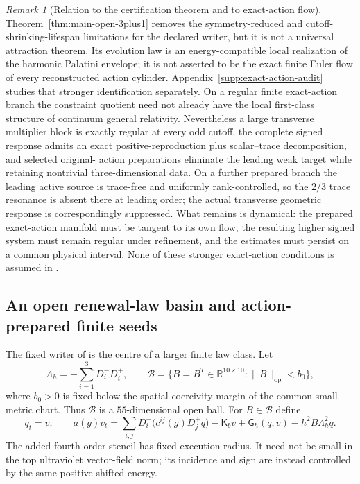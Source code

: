 \documentclass[11pt]{article}
\theoremstyle{definition}
\theoremstyle{remark}
\newtheorem{remark}[remark]{Remark}
\newcommand{\op}{\mathrm{op}}
\begin{document}
\begin{remark}[Relation to the certification theorem and to exact-action flow]
\label{rem:main-open-3plus1-scope}
Theorem~\ref{thm:main-open-3plus1} removes the symmetry-reduced and
cutoff-shrinking-lifespan limitations for the declared writer, but it is not a
universal attraction theorem.  Its evolution law is an energy-compatible
local realization of the harmonic Palatini envelope; it is not asserted to
be the exact finite Euler flow of every reconstructed action cylinder.
Appendix~\ref{supp:exact-action-audit} studies that stronger identification
separately.  On a regular finite exact-action branch the constraint quotient
need not already have the local first-class structure of continuum general
relativity.  Nevertheless a large transverse multiplier block is exactly
regular at every odd cutoff, the complete signed response admits an exact
positive-reproduction plus scalar--trace decomposition, and selected original-
action preparations eliminate the leading weak target while retaining
nontrivial three-dimensional data.  On a further prepared branch the leading
active source is trace-free and uniformly rank-controlled, so the $2/3$ trace
resonance is absent there at leading order; the actual transverse geometric
response is correspondingly suppressed.  What remains is dynamical: the
prepared exact-action manifold must be tangent to its own flow, the resulting
higher signed system must remain regular under refinement, and the estimates
must persist on a common physical interval.  None of these stronger
exact-action conditions is assumed in .
\end{remark}




\subsection{An open renewal-law basin and action-prepared finite seeds}
\label{subsec:main-open-law-basin}

The fixed writer of  is the centre of a larger
finite law class.  Let
\begin{equation}
 \Lambda_h=-\sum_{i=1}^3D_i^-D_i^+,
 \qquad
 \mathcal B=\{B=B^T\in\mathbb R^{10\times10}:\|B\|_{\op}<b_0\},
 \label{eq:main-law-ball}
\end{equation}
where $b_0>0$ is fixed below the spatial coercivity margin of the common small
metric chart.  Thus $\mathcal B$ is a $55$-dimensional open ball.  For
$B\in\mathcal B$ define
\begin{equation}
 \boxed{
 q_t=v,\qquad
 a(g)v_t=\sum_{i,j}D_i^-\!\bigl(c^{ij}(g)D_j^+q\bigr)
       -\mathsf K_bv+\mathsf G_h(q,v)-h^2B\Lambda_h^2q.}
 \label{eq:main-open-law-family}
\end{equation}
The added fourth-order stencil has fixed execution radius.  It need not be
small in the top ultraviolet vector-field norm; its incidence and sign are
instead controlled by the same positive shifted energy.
\end{document}
